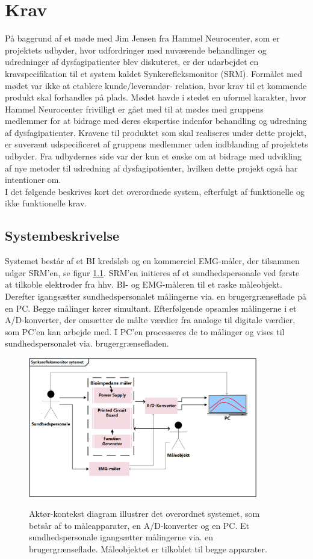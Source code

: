 \chapter{Krav}

På baggrund af et møde med Jim Jensen fra Hammel Neurocenter, som er projektets udbyder, hvor udfordringer med nuværende behandlinger og udredninger af dysfagipatienter blev diskuteret, er der udarbejdet en kravspecifikation til et system kaldet Synkerefleksmonitor (SRM). Formålet med mødet var ikke at etablere kunde/leverandør- relation, hvor krav til et kommende produkt skal forhandles på plads. Mødet havde i stedet en uformel karakter, hvor Hammel Neurocenter frivilligt er gået med til at mødes med gruppens medlemmer for at bidrage med deres ekspertise indenfor behandling og udredning af dysfagipatienter. Kravene til produktet som skal realiseres under dette projekt, er suverænt udspecificeret af gruppens medlemmer uden indblanding af projektets udbyder. Fra udbydernes side var der kun et ønske om at bidrage med udvikling af nye metoder til udredning af dysfagipatienter, hvilken dette projekt også har intentioner om. \\

I det følgende beskrives kort det overordnede system, efterfulgt af funktionelle og ikke funktionelle krav.  

\section{Systembeskrivelse}
Systemet består af et BI kredsløb og en kommerciel EMG-måler, der tilsammen udgør SRM'en, se figur \ref{fig:sysbeskrivelse}. SRM'en initieres af et sundhedspersonale ved første at tilkoble elektroder fra hhv. BI- og EMG-måleren til et raske måleobjekt. Derefter igangsætter sundhedspersonalet målingerne via. en brugergrænseflade på en PC. Begge målinger kører simultant. Efterfølgende opsamles målingerne i et A/D-konverter, der omsætter de målte værdier fra analoge til digitale værdier, som PC'en kan arbejde med. I PC'en processeres de to målinger og vises til sundhedspersonalet via. brugergrænsefladen.   

\begin{figure}[H]
\centering
{\includegraphics[width=10cm]
{Figure/AktoerKontextDiagram}}
\caption{Aktør-kontekst diagram illustrer det overordnet systemet, som betsår af to måleapparater, en A/D-konverter og en PC. Et sundhedspersonale igangsætter målingerne via. en brugergrænseflade. Måleobjektet er tilkoblet til begge apparater. }
\label{fig:sysbeskrivelse}
\end{figure}  

